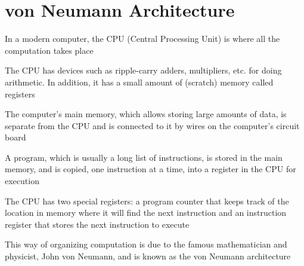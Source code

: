 \documentclass[8pt,a4paper,compress]{beamer}
\begin{document}
\section{von Neumann Architecture}
\begin{frame}[fragile]
\pause

In a modern computer, the CPU (Central Processing Unit) is where all the computation takes place

\pause
\bigskip

The CPU has devices such as ripple-carry adders, multipliers, etc. for doing arithmetic. In addition, it has a small amount of (scratch) memory called registers

\pause
\bigskip

The computer's main memory, which allows storing large amounts of data, is separate from the CPU and is connected to it by wires on the computer's circuit board

\pause
\bigskip

A program, which is usually a long list of instructions, is stored in the main memory, and is copied, one instruction at a time, into a register in the CPU for execution

\pause
\bigskip

The CPU has two special registers: a program counter that keeps track of the location in memory where it will find the next instruction and an instruction register that stores the next instruction to execute

\pause
\bigskip

This way of organizing computation is due to the famous mathematician and physicist, John von Neumann, and is known as the von Neumann architecture
\end{frame}
\end{document}
